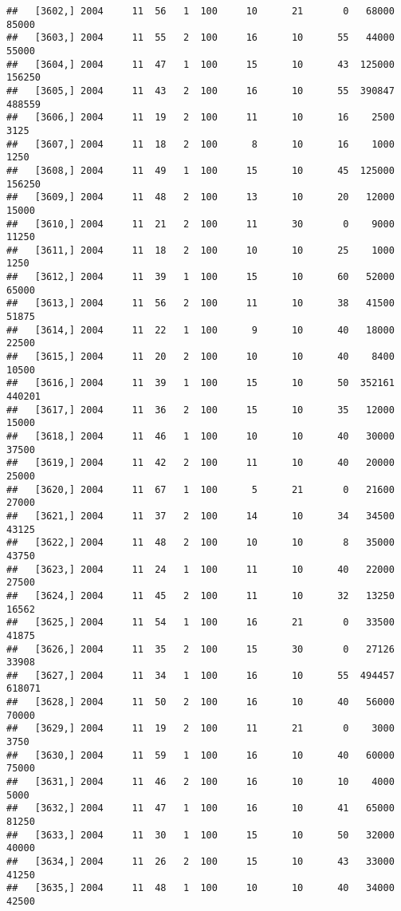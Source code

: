 \documentclass{article}\usepackage[]{graphicx}\usepackage[]{color}
\makeatletter
\newenvironment{kframe}{%
 \def\at@end@of@kframe{}%
 \ifinner\ifhmode%
  \def\at@end@of@kframe{\end{minipage}}%
  \begin{minipage}{\columnwidth}%
 \fi\fi%
 \def\FrameCommand##1{\hskip\@totalleftmargin \hskip-\fboxsep
 \colorbox{shadecolor}{##1}\hskip-\fboxsep
     \hskip-\linewidth \hskip-\@totalleftmargin \hskip\columnwidth}%
 \MakeFramed {\advance\hsize-\width
   \@totalleftmargin\z@ \linewidth\hsize
   \@setminipage}}%
 {\par\unskip\endMakeFramed%
 \at@end@of@kframe}
\newenvironment{knitrout}{}{} %
\makeatother
\begin{document}
\begin{knitrout}
\begin{kframe}
\begin{verbatim}
##   [3602,] 2004     11  56   1  100     10      21       0   68000   85000
##   [3603,] 2004     11  55   2  100     16      10      55   44000   55000
##   [3604,] 2004     11  47   1  100     15      10      43  125000  156250
##   [3605,] 2004     11  43   2  100     16      10      55  390847  488559
##   [3606,] 2004     11  19   2  100     11      10      16    2500    3125
##   [3607,] 2004     11  18   2  100      8      10      16    1000    1250
##   [3608,] 2004     11  49   1  100     15      10      45  125000  156250
##   [3609,] 2004     11  48   2  100     13      10      20   12000   15000
##   [3610,] 2004     11  21   2  100     11      30       0    9000   11250
##   [3611,] 2004     11  18   2  100     10      10      25    1000    1250
##   [3612,] 2004     11  39   1  100     15      10      60   52000   65000
##   [3613,] 2004     11  56   2  100     11      10      38   41500   51875
##   [3614,] 2004     11  22   1  100      9      10      40   18000   22500
##   [3615,] 2004     11  20   2  100     10      10      40    8400   10500
##   [3616,] 2004     11  39   1  100     15      10      50  352161  440201
##   [3617,] 2004     11  36   2  100     15      10      35   12000   15000
##   [3618,] 2004     11  46   1  100     10      10      40   30000   37500
##   [3619,] 2004     11  42   2  100     11      10      40   20000   25000
##   [3620,] 2004     11  67   1  100      5      21       0   21600   27000
##   [3621,] 2004     11  37   2  100     14      10      34   34500   43125
##   [3622,] 2004     11  48   2  100     10      10       8   35000   43750
##   [3623,] 2004     11  24   1  100     11      10      40   22000   27500
##   [3624,] 2004     11  45   2  100     11      10      32   13250   16562
##   [3625,] 2004     11  54   1  100     16      21       0   33500   41875
##   [3626,] 2004     11  35   2  100     15      30       0   27126   33908
##   [3627,] 2004     11  34   1  100     16      10      55  494457  618071
##   [3628,] 2004     11  50   2  100     16      10      40   56000   70000
##   [3629,] 2004     11  19   2  100     11      21       0    3000    3750
##   [3630,] 2004     11  59   1  100     16      10      40   60000   75000
##   [3631,] 2004     11  46   2  100     16      10      10    4000    5000
##   [3632,] 2004     11  47   1  100     16      10      41   65000   81250
##   [3633,] 2004     11  30   1  100     15      10      50   32000   40000
##   [3634,] 2004     11  26   2  100     15      10      43   33000   41250
##   [3635,] 2004     11  48   1  100     10      10      40   34000   42500

\end{verbatim}
\end{kframe}
\end{knitrout}
\end{document}
